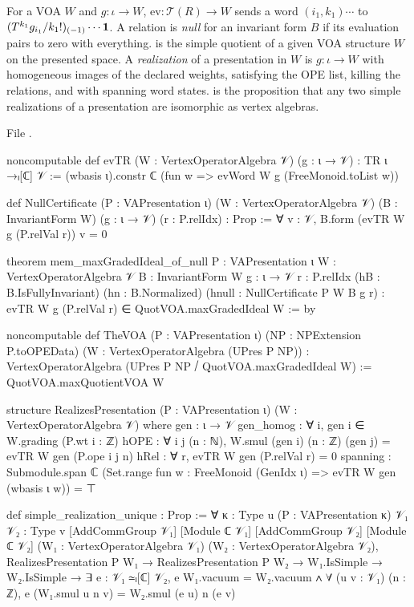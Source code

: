 \begin{definition}\label{l11:def:doctrine}
For a VOA $W$ and $g:\iota\to W$, $\mathrm{ev}:\mathcal T(R)\to W$ sends a word $(i_1,k_1)\cdots$ to
$(T^{k_1}g_{i_1}/k_1!)_{(-1)}\cdots\mathbf{1}$. A relation is \emph{null} for an invariant form $B$ if its evaluation pairs to zero with
everything.  is the simple quotient of a given VOA structure $W$ on the presented space. A \emph{realization} of a
presentation in $W$ is $g:\iota\to W$ with homogeneous images of the declared weights, satisfying the OPE list, killing the
relations, and with spanning word states. \allowbreak{}\allowbreak{} is the proposition that any two simple realizations of a
presentation are isomorphic as vertex algebras.
\end{definition}
\noindent File .
\begin{leancode}
noncomputable def evTR (W : VertexOperatorAlgebra 𝒱) (g : ι → 𝒱) : TR ι →ₗ[ℂ] 𝒱 :=
  (wbasis ι).constr ℂ (fun w => evWord W g (FreeMonoid.toList w))

def NullCertificate (P : VAPresentation ι) (W : VertexOperatorAlgebra 𝒱)
    (B : InvariantForm W) (g : ι → 𝒱) (r : P.relIdx) : Prop :=
  ∀ v : 𝒱, B.form (evTR W g (P.relVal r)) v = 0

theorem mem_maxGradedIdeal_of_null {P : VAPresentation ι} {W : VertexOperatorAlgebra 𝒱}
    {B : InvariantForm W} {g : ι → 𝒱} {r : P.relIdx}
    (hB : B.IsFullyInvariant) (hn : B.Normalized)
    (hnull : NullCertificate P W B g r) :
    evTR W g (P.relVal r) ∈ QuotVOA.maxGradedIdeal W := by

noncomputable def TheVOA (P : VAPresentation ι) (NP : NPExtension P.toOPEData)
    (W : VertexOperatorAlgebra (UPres P NP)) :
    VertexOperatorAlgebra (UPres P NP ⧸ QuotVOA.maxGradedIdeal W) :=
  QuotVOA.maxQuotientVOA W

structure RealizesPresentation (P : VAPresentation ι) (W : VertexOperatorAlgebra 𝒱) where
  gen : ι → 𝒱
  gen_homog : ∀ i, gen i ∈ W.grading (P.wt i : ℤ)
  hOPE : ∀ i j (n : ℕ), W.smul (gen i) (n : ℤ) (gen j) = evTR W gen (P.ope i j n)
  hRel : ∀ r, evTR W gen (P.relVal r) = 0
  spanning : Submodule.span ℂ
    (Set.range fun w : FreeMonoid (GenIdx ι) => evTR W gen (wbasis ι w)) = ⊤

def simple_realization_unique : Prop :=
  ∀ {κ : Type u} (P : VAPresentation κ) {𝒱₁ 𝒱₂ : Type v}
    [AddCommGroup 𝒱₁] [Module ℂ 𝒱₁] [AddCommGroup 𝒱₂] [Module ℂ 𝒱₂]
    (W₁ : VertexOperatorAlgebra 𝒱₁) (W₂ : VertexOperatorAlgebra 𝒱₂),
    RealizesPresentation P W₁ → RealizesPresentation P W₂ →
    W₁.IsSimple → W₂.IsSimple →
    ∃ e : 𝒱₁ ≃ₗ[ℂ] 𝒱₂,
      e W₁.vacuum = W₂.vacuum ∧
      ∀ (u v : 𝒱₁) (n : ℤ), e (W₁.smul u n v) = W₂.smul (e u) n (e v)
\end{leancode}

